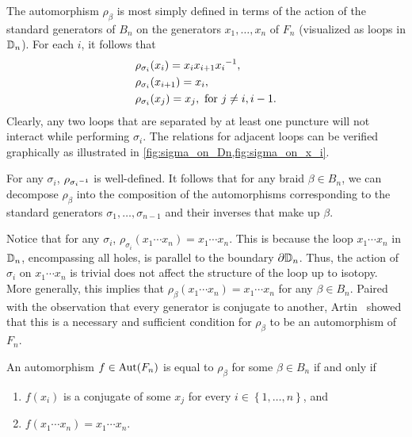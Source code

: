 The automorphism $\rho_\beta$ is most simply defined in terms of the action of the standard generators of $B_n$ on the generators $x_1,\dots,x_n$ of $F_n$ (visualized as loops in $\mathbb{D}_n$). For each $i$, it follows that
\begin{align}
    &\rho_{\sigma_i}(x_{i}) = x_{i}x_{i+1} { x_{i} }^{-1}, \label{eq:rho_i}\\
    &\rho_{\sigma_i}(x_{i+1}) = x_{i}, \label{eq:rho_ip1}\\
    &\rho_{\sigma_i}(x_j) = x_j, \textrm{ for } j\neq i,i-1.\label{eq:rho_j}
\end{align}
Clearly, any two loops that are separated by at least one puncture will not interact while performing $\sigma_i$. The relations for adjacent loops can be verified graphically as illustrated in \cref{fig:sigma_on_Dn,fig:sigma_on_x_i}.
\begin{figure}[htbp]
    \centering
    
    \label{fig:sigma_on_x_i}
\end{figure}

For any $\sigma_i$, $\rho_{{ \sigma_i }^{-1}}$ is well-defined. It follows that for any braid $\beta\in B_n$, we can decompose $\rho_\beta$ into the composition of the automorphisms corresponding to the standard generators $\sigma_1,\dots,\sigma_{n-1}$ and their inverses that make up $\beta$. 

Notice that for any $\sigma_i$, $\rho_{\sigma_i}(x_1\cdots x_n) = x_1\cdots x_n$. This is because the loop $x_1\cdots x_n$ in $\mathbb{D}_n$, encompassing all holes, is parallel to the boundary $\partial\mathbb{D}_n$. Thus, the action of $\sigma_i$ on $x_1\cdots x_n$ is trivial does not affect the structure of the loop up to isotopy. More generally, this implies that $\rho_\beta(x_1\cdots x_n) = x_1\cdots x_n$ for any $\beta\in B_n$. Paired with the observation that every generator is conjugate to another, Artin~\cite{Artin1947} showed that this is a necessary and sufficient condition for $\rho_\beta$ to be an automorphism of $F_n$.

\begin{theorem}\label{thm:autFn}
    An automorphism $f\in\textrm{Aut}\!\left( F_n \right)$ is equal to $\rho_\beta$ for some $\beta\in B_n$ if and only if
    \begin{enumerate}
        \item $f(x_i)$ is a conjugate of some $x_j$ for every $i\in\left\{ 1,\dots,n \right\}$, and
        \item $f(x_1\cdots x_n) = x_1\cdots x_n$.
    \end{enumerate}
\end{theorem}


